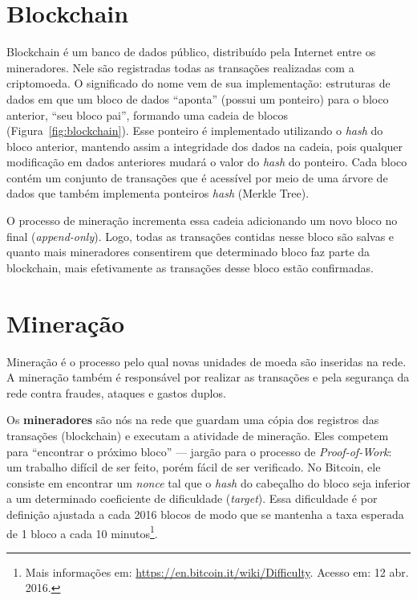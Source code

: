 \section{Blockchain}

Blockchain é um banco de dados público, distribuído pela Internet entre os mineradores. Nele são registradas todas as transações realizadas com a criptomoeda. O significado do nome vem de sua implementação: estruturas de dados em que um bloco de dados ``aponta'' (possui um ponteiro) para o bloco anterior, ``seu bloco pai'', formando uma cadeia de blocos (Figura~\ref{fig:blockchain}). Esse ponteiro é implementado utilizando o \textit{hash} do bloco anterior, mantendo assim a integridade dos dados na cadeia, pois qualquer modificação em dados anteriores mudará o valor do \textit{hash} do ponteiro. Cada bloco contém um conjunto de transações que é acessível por meio de uma árvore de dados que também implementa ponteiros \textit{hash} (Merkle Tree).

O processo de mineração incrementa essa cadeia adicionando um novo bloco no final (\textit{append-only}). Logo, todas as transações contidas nesse bloco são salvas e quanto mais mineradores consentirem que determinado bloco faz parte da blockchain, mais efetivamente as transações desse bloco estão confirmadas.

\section{Mineração}
\label{sec:mineracao}

Mineração é o processo pelo qual novas unidades de moeda são inseridas na rede. A mineração também é responsável por realizar as transações e pela segurança da rede contra fraudes, ataques e gastos duplos.

Os \textbf{mineradores} são nós na rede que guardam uma cópia dos registros das transações (blockchain) e executam a atividade de mineração. Eles competem para ``encontrar o próximo bloco'' --- jargão para o processo de \textit{Proof-of-Work}: um trabalho difícil de ser feito, porém fácil de ser verificado. No Bitcoin, ele consiste em encontrar um \textit{nonce} tal que o \textit{hash} do cabeçalho do bloco seja inferior a um determinado coeficiente de dificuldade (\textit{target}). Essa dificuldade é por definição ajustada a cada 2016 blocos de modo que se mantenha a taxa esperada de 1 bloco a cada 10 minutos\footnote{Mais informações em: \url{https://en.bitcoin.it/wiki/Difficulty}. Acesso em: 12 abr. 2016.}.

